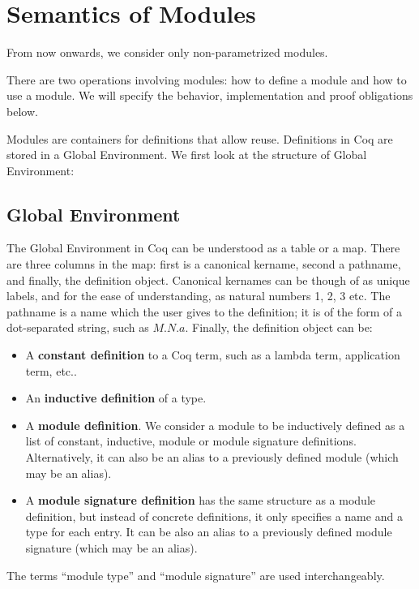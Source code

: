 \section{Semantics of Modules}
\label{sec:semantics-of-modules}
From now onwards, we consider only non-parametrized modules.

There are two operations involving modules: how to define a module and how to
use a module. We will specify the behavior, implementation and proof
obligations below.

Modules are containers for definitions that allow reuse. Definitions in Coq are
stored in a Global Environment. We first look at the structure of Global Environment:

\subsection{Global Environment}
The Global Environment in Coq can be understood as a table or a map. There are
three columns in the map: first is a canonical kername, second a pathname, and
finally, the definition object. Canonical kernames can be though of as unique
labels, and for the ease of understanding, as natural numbers 1, 2, 3 etc.
The pathname is a name which the user gives to the definition; it is of the form
of a dot-separated string, such as $M.N.a$. Finally, the definition object can
be:
\begin{itemize}

\item A \textbf{constant definition} to a Coq term, such as a lambda term,
application term, etc..

\item An \textbf{inductive definition} of a type.

\item A \textbf{module definition}. We consider a module to be inductively
defined as a list of constant, inductive, module or module signature
definitions. Alternatively, it can also be an alias to a previously defined
module (which may be an alias).

\item A \textbf{module signature definition} has the same structure as a module
definition, but instead of concrete definitions, it only specifies a name and a
type for each entry. It can be also an alias to a previously defined module
signature (which may be an alias).

\end{itemize}
The terms ``module type'' and ``module signature'' are used interchangeably.

